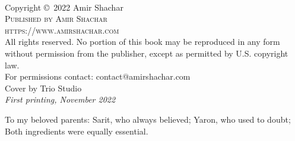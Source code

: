 \documentclass[11pt]{book}
\begin{document}

\begingroup
\thispagestyle{empty} %
\vfill
\endgroup


\newpage
~\vfill
\thispagestyle{empty}

\noindent Copyright \copyright\ 2022 Amir Shachar\\ %

\noindent \textsc{Published by Amir Shachar}\\

\noindent \textsc{https://www.amirshachar.com}\\

\noindent All rights reserved. No portion of this book may be reproduced in any form without permission from the publisher, except as permitted by U.S. copyright law.\\

\noindent For permissions contact: contact@amirshachar.com\\

\noindent Cover by Trio Studio \\

\noindent \textit{First printing, November 2022} %

\clearpage
\begin{center}
    \thispagestyle{empty}
    \vspace*{\fill}
    To my beloved parents:\linebreak
Sarit, who always believed;\linebreak
Yaron, who used to doubt;\linebreak
Both ingredients were equally essential.
    \vspace*{\fill}
\end{center}
\clearpage
\end{document}
